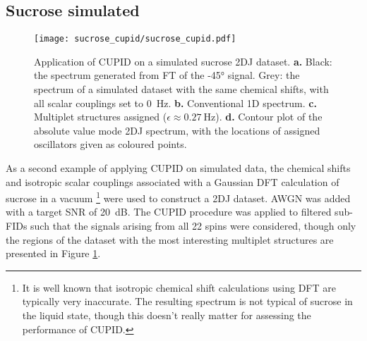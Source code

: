 \subsection{Sucrose simulated}
\label{subsec:sucrose-cupid}
\begin{figure}
    \centering
    \texttt{[image: sucrose\_cupid/sucrose\_cupid.pdf]}
    \caption[
        Application of \acs{CUPID} on a simulated sucrose \acs{2DJ} dataset.
    ]
    {
        Application of \ac{CUPID} on a simulated sucrose \ac{2DJ} dataset.
        \textbf{a.} Black: the spectrum generated from \ac{FT} of the \ang{-45}
        signal. Grey: the spectrum of a simulated dataset with the same
        chemical shifts, with all scalar couplings set to \qty{0}{\hertz}.
        \textbf{b.} Conventional \ac{1D} spectrum.
        \textbf{c.} Multiplet structures assigned ($\epsilon \approx
        \qty{0.27}{\hertz}$).
        \textbf{d.} Contour plot of the absolute value mode \ac{2DJ} spectrum,
        with the locations of assigned oscillators given as coloured points.
    }
    \label{fig:sucrose-cupid}
\end{figure}
As a second example of applying \ac{CUPID} on simulated data, the chemical
shifts and isotropic scalar couplings associated with a
Gaussian\cite{Gaussian03} \ac{DFT} calculation of sucrose in a vacuum
\footnote{
It is well known that isotropic chemical shift calculations using \ac{DFT} are
typically very inaccurate. The resulting spectrum is not typical of sucrose in
the liquid state, though this doesn't really matter for assessing the
performance of \ac{CUPID}.
}
were used to construct a 2DJ dataset. \ac{AWGN} was added with a target
\ac{SNR} of \qty{20}{\deci\bel}. The CUPID procedure was applied to filtered
sub-FIDs such that the signals arising from all 22 spins were considered, though
only the regions of the dataset with the most interesting multiplet structures
are presented in Figure \ref{fig:sucrose-cupid}.

